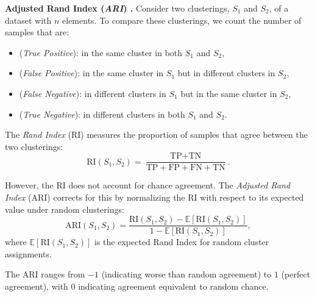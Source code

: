     \begin{dfn}
        \textbf{Adjusted Rand Index (\emph{ARI}) \cite{Hubert1985}.}
        Consider two clusterings, \(S_1\) and \(S_2\), of a dataset with \(n\) elements. To compare these clusterings, we count the number of samples that are:
        \begin{itemize}
            \item {} (\emph{True Positive}): in the same cluster in both \(S_1\) and \(S_2\),
            \item {} (\emph{False Positive}): in the same cluster in \(S_1\) but in different clusters in \(S_2\),
            \item {} (\emph{False Negative}): in different clusters in \(S_1\) but in the same cluster in \(S_2\),
            \item {} (\emph{True Negative}): in different clusters in both \(S_1\) and \(S_2\).
        \end{itemize}

        The \emph{Rand Index} (RI) measures the proportion of samples that agree between the two clusterings:
        \[
            \text{RI}(S_1, S_2) = \frac{\text{TP} + \text{TN}}{\text{TP} + \text{FP} + \text{FN} + \text{TN}}.
        \]

        However, the RI does not account for chance agreement. The \emph{Adjusted Rand Index} (ARI) corrects for this by normalizing the RI with respect to its expected value under random clusterings:
        \[
            \text{ARI}(S_1, S_2) = \frac{\text{RI}(S_1, S_2) - \mathbb{E}[\text{RI}(S_1, S_2)]}{1 - \mathbb{E}[\text{RI}(S_1, S_2)]},
        \]
        where \(\mathbb{E}[\text{RI}(S_1, S_2)]\) is the expected Rand Index for random cluster assignments.

        The ARI ranges from \(-1\) (indicating worse than random agreement) to \(1\) (perfect agreement), with \(0\) indicating agreement equivalent to random chance.
    \end{dfn}


